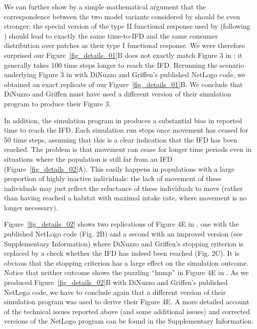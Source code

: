 \begin{interludeenv}
	We can further show by a simple mathematical argument that the correspondence between the two model variants considered by \citeauthor{dinuzzo2020} should be even stronger: the special version of the type II functional response used by \citeauthor{dinuzzo2020} (following \cite{abrams2000}) should lead to exactly the same time-to-IFD and the same consumer distribution over patches as their type I functional response.
	We were therefore surprised our Figure~\ref{fig_details_01}B does not exactly match Figure 3 in \parencite{dinuzzo2020}: it generally takes 100 time steps longer to reach the IFD.
	Rerunning the scenario underlying Figure 3 in \parencite{dinuzzo2020} with DiNuzzo and Griffen's published NetLogo code, we obtained an exact replicate of our Figure~\ref{fig_details_01}B.
	We conclude that DiNuzzo and Griffen must have used a different version of their simulation program to produce their Figure 3.

	In addition, the simulation program in \parencite{dinuzzo2020} produces a substantial bias in reported time to reach the IFD.
	Each simulation run stops once movement has ceased for 50 time steps, assuming that this is a clear indication that the IFD has been reached.
	The problem is that movement can cease for longer time periods even in situations where the population is still far from an IFD (Figure~\ref{fig_details_02}A).
	This easily happens in populations with a large proportion of highly inactive individuals: the lack of movement of these individuals may just reflect the reluctance of these individuals to move (rather than having reached a habitat with maximal intake rate, where movement is no longer necessary).
	
	Figure~\ref{fig_details_02} shows two replications of Figure 4E in \textcite{dinuzzo2020}, one with the published NetLogo code (Fig. 2B) and a second with an improved version (see Supplementary Information) where DiNuzzo and Griffen's stopping criterion is replaced by a check whether the IFD has indeed been reached (Fig. 2C).
	It is obvious that the stopping criterion has a large effect on the simulation outcome.
	Notice that neither outcome shows the puzzling ``hump'' in Figure 4E in \parencite{dinuzzo2020}.
	As we produced Figure~\ref{fig_details_02}B with DiNuzzo and Griffen's published NetLogo code, we have to conclude again that a different version of their simulation program was used to derive their Figure 4E.
	A more detailed account of the technical issues reported above (and some additional issues) and corrected versions of the NetLogo program can be found in the Supplementary Information.


\end{interludeenv}
